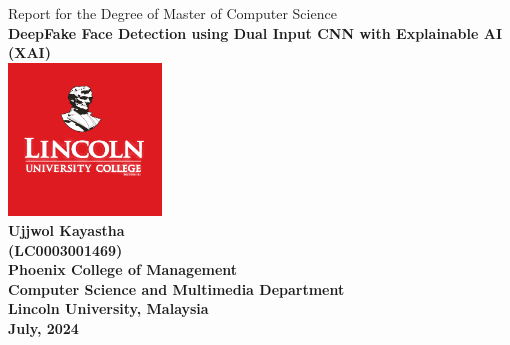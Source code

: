 \pagestyle{empty}
\begin{center}
    \Large{Report for the Degree of Master of Computer Science}\\[31pt]

    \LARGE{\textbf{DeepFake Face Detection using Dual Input CNN with Explainable AI (XAI)}}\\[93pt]


    \includegraphics*[width=1.6in,height=1.6in]{images/logo.png}\\[93pt]

    \Large{\textbf{Ujjwol Kayastha \\ (LC0003001469)}}\\[31pt]

    \Large{\textbf{
            Phoenix College of Management \\
            Computer Science and Multimedia Department \\
            Lincoln University, Malaysia
        }}\\[31pt]

    \Large{\textbf{
            July, 2024
        }}\\[31pt]
\end{center}